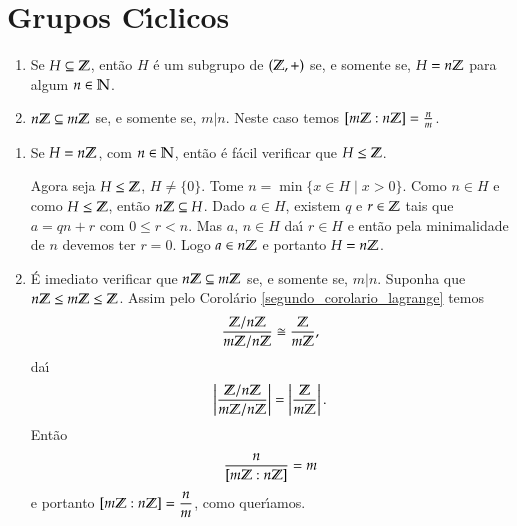 

\section{Grupos C{\'\i}clicos} %
\label{sec:grupos_ciclicos}

\begin{proposicao}
	\begin{enumerate}[label=({\roman*})]
		\item Se $H \subseteq \mathbb{Z}$, ent\~ao $H$ \'e um subgrupo de $(\mathbb{Z}, +)$ se, e somente se, $H = n\mathbb{Z}$ para algum $n \in \mathbb{N}$.
		
		\item $n\mathbb{Z} \subseteq m\mathbb{Z}$ se, e somente se, $m | n$. Neste caso temos $[m\mathbb{Z} : n\mathbb{Z}] = \frac{n}{m}$.
	\end{enumerate}
\end{proposicao}
\begin{prova}
	\begin{enumerate}[label=({\roman*})]
		\item Se $H = n\mathbb{Z}$, com $n \in \mathbb{N}$, ent\~ao \'e f\'acil verificar que $H \le \mathbb{Z}$.

		Agora seja $H \le \mathbb{Z}$, $H \ne \{0\}$. Tome $n = \min\{x \in H \mid x > 0\}$. Como $n \in H$ e como $H \le \mathbb{Z}$, ent\~ao $n\mathbb{Z} \subseteq H$. Dado $a \in H$, existem $q$ e $r \in \mathbb{Z}$ tais que $a = qn + r$ com $0 \le r < n$. Mas $a$, $n \in H$ da{\'\i} $r \in H$ e ent\~ao pela minimalidade de $n$ devemos ter $r = 0$. Logo $a \in n\mathbb{Z}$ e portanto $H = n\mathbb{Z}$.

		\item \'E imediato verificar que $n\mathbb{Z} \subseteq m\mathbb{Z}$ se, e somente se, $m | n$. Suponha que $n\mathbb{Z} \le m\mathbb{Z} \le \mathbb{Z}$. Assim pelo Corol\'ario \ref{segundo_corolario_lagrange} temos
		\[
			\dfrac{\mathbb{Z}/n\mathbb{Z}}{m\mathbb{Z}/n\mathbb{Z}} \cong \dfrac{\mathbb{Z}}{m\mathbb{Z}},
		\]
		da{\'\i}
		\[
			\left|\dfrac{\mathbb{Z}/n\mathbb{Z}}{m\mathbb{Z}/n\mathbb{Z}}\right| = \left|\dfrac{\mathbb{Z}}{m\mathbb{Z}}\right|.
		\]
		Ent\~ao
		\[
			\dfrac{n}{[m\mathbb{Z} : n\mathbb{Z}]} = m
		\]
		e portanto $[m\mathbb{Z} : n\mathbb{Z}] = \dfrac{n}{m}$, como quer{\'\i}amos.

	\end{enumerate}
\end{prova}

